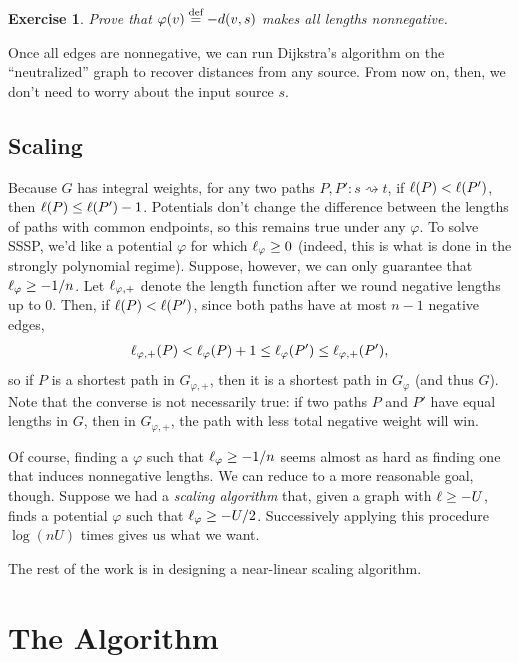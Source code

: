 \documentclass[12pt]{article}
\newtheorem*{exercise}{Exercise}
\begin{document}
\begin{exercise}
  Prove that $\varphi(v) \defeq - \dist{v, s}$ makes all lengths nonnegative.
\end{exercise}

Once all edges are nonnegative, we can run Dijkstra's algorithm on the
``neutralized'' graph to recover distances from any source. From now on, then,
we don't need to worry about the input source $s$.

\subsection{Scaling}

Because $G$ has integral weights, for any two paths
$P, P' : s \rightsquigarrow t$, if $\len{P} < \len{P'}$, then
$\len{P} \leq \len{P'} - 1$. Potentials don't change the difference between the
lengths of paths with common endpoints, so this remains true under any
$\varphi$. To solve SSSP, we'd like a potential $\varphi$ for which
$\len_\varphi \geq 0$ (indeed, this is what is done in the strongly polynomial
regime). Suppose, however, we can only guarantee that $\len_\varphi \geq -1/n$.
Let $\len_{\varphi, +}$ denote the length function after we round negative
lengths up to $0$. Then, if $\len{P} < \len{P'}$, since both paths have at most
$n - 1$ negative edges,
\begin{align*}
  \len{P}_{\varphi, +} <    \len{P}_\varphi + 1
                       \leq \len{P'}_\varphi
                       \leq \len{P'}_{\varphi, +},
\end{align*}
so if $P$ is a shortest path in $G_{\varphi, +}$, then it is a shortest path in
$G_\varphi$ (and thus $G$). Note that the converse is not necessarily true: if
two paths $P$ and $P'$ have equal lengths in $G$, then in $G_{\varphi, +}$, the
path with less total negative weight will win.

Of course, finding a $\varphi$ such that $\len_\varphi \geq -1/n$ seems almost
as hard as finding one that induces nonnegative lengths. We can reduce to a more
reasonable goal, though. Suppose we had a \emph{scaling algorithm} that, given a
graph with $\len \geq -U$, finds a potential $\varphi$ such that
$\len_\varphi \geq -U/2$. Successively applying this procedure $\log(nU)$ times
gives us what we want.

The rest of the work is in designing a near-linear scaling algorithm.

\section{The Algorithm}
\end{document}
